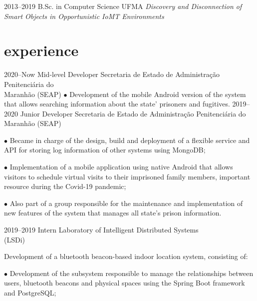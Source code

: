 \documentclass[]{../document-class/twentysecondcv}
\begin{document}
\begin{twenty}
	\twentyitem
		{2013--2019}
		{B.Sc. in Computer Science}
		{UFMA}
		{\emph{Discovery and Disconnection of Smart Objects in Opportunistic IoMT Environments}}
\end{twenty}

\section{experience}

\begin{twenty}
	\twentyitem
		{2020--Now} %
		{Mid-level Developer} %
		{Secretaria de Estado de Administração Penitenciária do \\\hspace*{\fill}Maranhão (SEAP)}
		{$\bullet$ Development of the mobile Android version of the system that allows searching information about the state' prisoners and fugitives.}
	\twentyitem
		{2019--2020} %
		{Junior Developer} %
		{Secretaria de Estado de Administração Penitenciária do \\\hspace*{\fill}Maranhão (SEAP)}
		{$\bullet$ Became in charge of the design, build and deployment of a flexible service and API for storing log information of other systems using MongoDB;\vskip 4pt
			
		$\bullet$ Implementation of a mobile application using native Android that allows visitors to schedule virtual visits to their imprisoned family members,  important resource during the Covid-19 pandemic;\vskip 4pt


		$\bullet$ Also part of a group responsible for the maintenance and implementation of new features of the system that manages all state's prison information.}
		
	\twentyitem
		{2019--2019} %
		{Intern} %
		{Laboratory of Intelligent Distributed Systems \\\hspace*{\fill}(LSDi)}
		{Development of a bluetooth beacon-based indoor location system, consisting of:\vskip 4pt
          
        
		$\bullet$ Development of the subsystem responsible to manage the relationships between users, bluetooth beacons and physical spaces using the Spring Boot framework and PostgreSQL;\vskip 4pt

}
\end{twenty}
\end{document}
